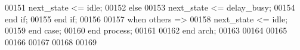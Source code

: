 \begin{DoxyCode}
00151                 \textcolor{vhdlchar}{next_state} \textcolor{vhdlchar}{<=} \textcolor{vhdlchar}{idle};
00152                     \textcolor{keywordflow}{else} 
00153                         \textcolor{vhdlchar}{next_state} \textcolor{vhdlchar}{<=} \textcolor{vhdlchar}{delay\_busy};   
00154                     \textcolor{keywordflow}{end} \textcolor{keywordflow}{if}; 
00155                 \textcolor{keywordflow}{end} \textcolor{keywordflow}{if};
00156             
00157          \textcolor{keywordflow}{when} \textcolor{keywordflow}{others}        \textcolor{vhdlchar}{=}\textcolor{vhdlchar}{>}
00158             \textcolor{vhdlchar}{next_state} \textcolor{vhdlchar}{<=} \textcolor{vhdlchar}{idle};
00159       \textcolor{keywordflow}{end} \textcolor{keywordflow}{case};
00160    \textcolor{keywordflow}{end} \textcolor{keywordflow}{process};
00161 
00162 \textcolor{keywordflow}{end} \textcolor{vhdlchar}{arch};   
00163 
00164 
00165 
00166 
00167 
00168 
00169 
\end{DoxyCode}
